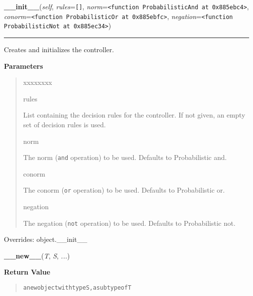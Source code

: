     \begin{boxedminipage}{\textwidth}

    \raggedright \textbf{\_\_init\_\_}(\textit{self}, \textit{rules}=\texttt{\texttt{[}\texttt{]}}, \textit{norm}=\texttt{{\textless}function ProbabilisticAnd at 0x885ebc4{\textgreater}}, \textit{conorm}=\texttt{{\textless}function ProbabilisticOr at 0x885ebfc{\textgreater}}, \textit{negation}=\texttt{{\textless}function ProbabilisticNot at 0x885ec34{\textgreater}})

    \vspace{-1.5ex}

    \rule{\textwidth}{0.5\fboxrule}

Creates and initializes the controller.
    \vspace{1ex}

      \textbf{Parameters}
      \begin{quote}
        \begin{Ventry}{xxxxxxxx}

          \item[rules]


List containing the decision rules for the controller. If not given,
an empty set of decision rules is used.
          \item[norm]


The norm (\texttt{and} operation) to be used. Defaults to Probabilistic
and.
          \item[conorm]


The conorm (\texttt{or} operation) to be used. Defaults to Probabilistic
or.
          \item[negation]


The negation (\texttt{not} operation) to be used. Defaults to
Probabilistic not.
        \end{Ventry}

      \end{quote}

    \vspace{1ex}

      Overrides: object.\_\_init\_\_

    \end{boxedminipage}

    \label{object:__new__}

    \vspace{0.5ex}

    \begin{boxedminipage}{\textwidth}

    \raggedright \textbf{\_\_new\_\_}(\textit{T}, \textit{S}, \textit{...})

      \textbf{Return Value}
      \begin{quote}
\begin{alltt}
a new object with type S, a subtype of T
\end{alltt}

      \end{quote}

    \vspace{1ex}

    \end{boxedminipage}

